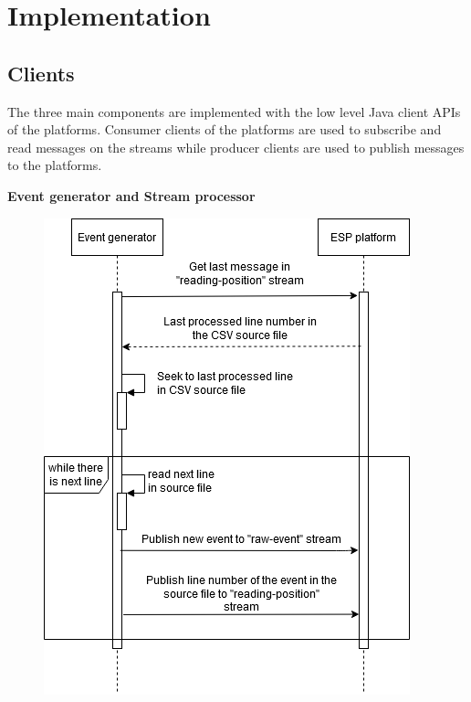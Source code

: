 \section{Implementation}
\subsection{Clients}
The three main components are implemented with the low level Java client APIs of the platforms. Consumer clients of the platforms are used to subscribe and read messages on the streams while producer clients are used to publish messages to the platforms.

\textbf{Event generator and Stream processor}

\begin{figure}[ht!]
	\begin{adjustwidth}{-1cm}{-1cm}
	\centering
	\begin{minipage}[t]{.48\linewidth}
		\centering
		\includegraphics[width=\linewidth]{images/implement-event-generator.png}

\end{minipage}
\end{adjustwidth}
\end{figure}
